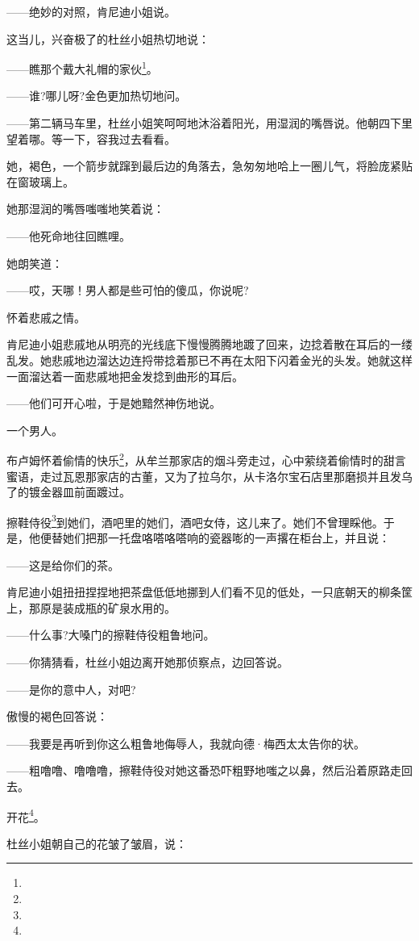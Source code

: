 \par ——绝妙的对照，肯尼迪小姐说。
\par 这当儿，兴奋极了的杜丝小姐热切地说：
\par ——瞧那个戴大礼帽的家伙\footnote{}。
\par ——谁?哪儿呀?金色更加热切地问。
\par ——第二辆马车里，杜丝小姐笑呵呵地沐浴着阳光，用湿润的嘴唇说。他朝四下里望着哪。等一下，容我过去看看。
\par 她，褐色，一个箭步就蹿到最后边的角落去，急匆匆地哈上一圈儿气，将脸庞紧贴在窗玻璃上。
\par 她那湿润的嘴唇嗤嗤地笑着说：
\par ——他死命地往回瞧哩。
\par 她朗笑道：
\par ——哎，天哪！男人都是些可怕的傻瓜，你说呢?
\par 怀着悲戚之情。
\par 肯尼迪小姐悲戚地从明亮的光线底下慢慢腾腾地踱了回来，边捻着散在耳后的一缕乱发。她悲戚地边溜达边连捋带捻着那已不再在太阳下闪着金光的头发。她就这样一面溜达着一面悲戚地把金发捻到曲形的耳后。
\par ——他们可开心啦，于是她黯然神伤地说。
\par 一个男人。
\par 布卢姆怀着偷情的快乐\footnote{}，从牟兰那家店的烟斗旁走过，心中萦绕着偷情时的甜言蜜语，走过瓦恩那家店的古董，又为了拉乌尔，从卡洛尔宝石店里那磨损并且发乌了的镀金器皿前面踱过。
\par 擦鞋侍役\footnote{}到她们，酒吧里的她们，酒吧女侍，这儿来了。她们不曾理睬他。于是，他便替她们把那一托盘咯嗒咯嗒响的瓷器嘭的一声撂在柜台上，并且说：
\par ——这是给你们的茶。
\par 肯尼迪小姐扭扭捏捏地把茶盘低低地挪到人们看不见的低处，一只底朝天的柳条筐上，那原是装成瓶的矿泉水用的。
\par ——什么事?大嗓门的擦鞋侍役粗鲁地问。
\par ——你猜猜看，杜丝小姐边离开她那侦察点，边回答说。
\par ——是你的意中人，对吧?
\par 傲慢的褐色回答说：
\par ——我要是再听到你这么粗鲁地侮辱人，我就向德·梅西太太告你的状。
\par ——粗噜噜、噜噜噜，擦鞋侍役对她这番恐吓粗野地嗤之以鼻，然后沿着原路走回去。
\par 开花\footnote{}。
\par 杜丝小姐朝自己的花皱了皱眉，说：
